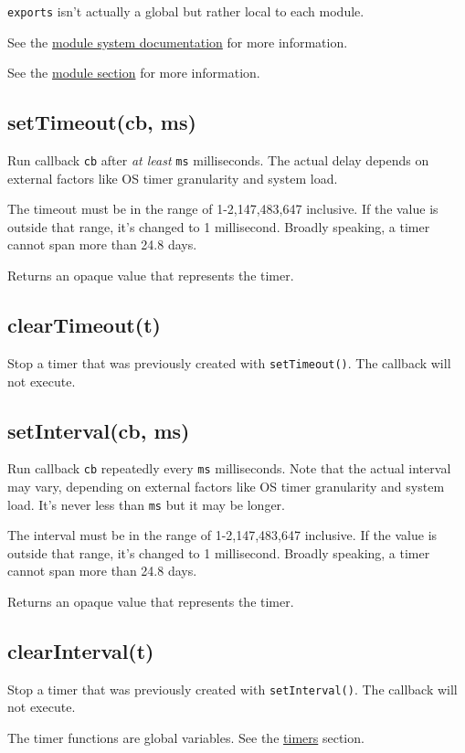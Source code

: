 \texttt{exports} isn't actually a global but rather local to each
module.

See the \href{modules.html}{module system documentation} for more
information.

See the \href{modules.html}{module section} for more information.

\subsection{setTimeout(cb, ms)}\label{settimeoutcb-ms}

Run callback \texttt{cb} after \emph{at least} \texttt{ms} milliseconds.
The actual delay depends on external factors like OS timer granularity
and system load.

The timeout must be in the range of 1-2,147,483,647 inclusive. If the
value is outside that range, it's changed to 1 millisecond. Broadly
speaking, a timer cannot span more than 24.8 days.

Returns an opaque value that represents the timer.

\subsection{clearTimeout(t)}\label{cleartimeoutt}

Stop a timer that was previously created with \texttt{setTimeout()}. The
callback will not execute.

\subsection{setInterval(cb, ms)}\label{setintervalcb-ms}

Run callback \texttt{cb} repeatedly every \texttt{ms} milliseconds. Note
that the actual interval may vary, depending on external factors like OS
timer granularity and system load. It's never less than \texttt{ms} but
it may be longer.

The interval must be in the range of 1-2,147,483,647 inclusive. If the
value is outside that range, it's changed to 1 millisecond. Broadly
speaking, a timer cannot span more than 24.8 days.

Returns an opaque value that represents the timer.

\subsection{clearInterval(t)}\label{clearintervalt}

Stop a timer that was previously created with \texttt{setInterval()}.
The callback will not execute.

The timer functions are global variables. See the
\href{timers.html}{timers} section.
